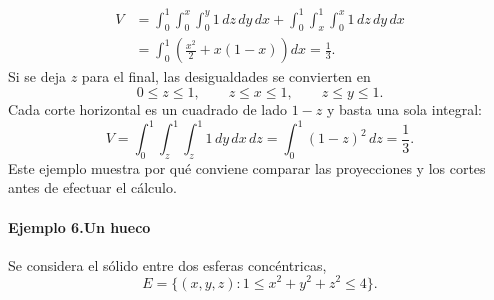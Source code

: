 \begin{align*}
V&=\int_0^1\int_0^x\int_0^y1\,dz\,dy\,dx
+\int_0^1\int_x^1\int_0^x1\,dz\,dy\,dx\\
&=\int_0^1\left(\frac{x^2}{2}+x(1-x)\right)dx=\frac13.
\end{align*}
Si se deja $z$ para el final, las desigualdades se convierten en
\[
0\leq z\leq1,\qquad z\leq x\leq1,\qquad z\leq y\leq1.
\]
Cada corte horizontal es un cuadrado de lado $1-z$ y basta una sola integral:
\[
V=\int_0^1\int_z^1\int_z^1 1\,dy\,dx\,dz
=\int_0^1(1-z)^2\,dz=\frac13.
\]
Este ejemplo muestra por qué conviene comparar las proyecciones y los cortes antes de efectuar el cálculo.

\paragraph{Ejemplo 6.Un hueco}

Se considera el sólido entre dos esferas concéntricas,
\[
E=\{(x,y,z):1\leq x^2+y^2+z^2\leq4\}.
\]


